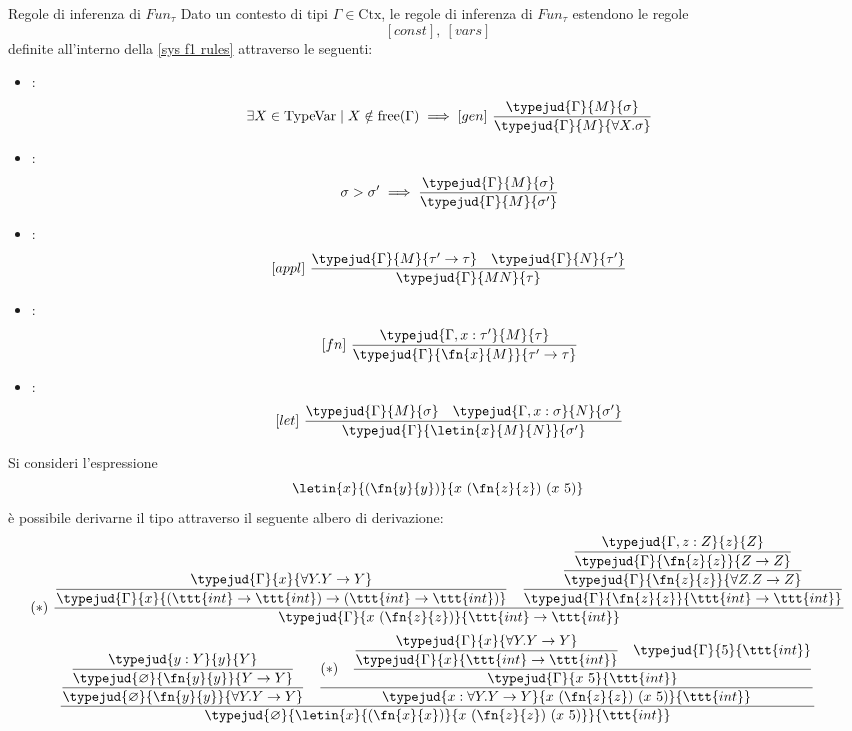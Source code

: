 \documentclass[a4paper, 12pt]{report}
\begin{document}
    \begin{framedprop}[breakable]{Regole di inferenza di $Fun_\tau$}
        Dato un contesto di tipi $\Gamma \in \mathrm{Ctx}$, le regole di inferenza di $Fun_\tau$ estendono le regole $$[const], \ [vars]$$ definite all'interno della \cref{sys f1 rules} attraverso le seguenti:

        \begin{itemize}
            \item {}: $$\exists X \in \mathrm{TypeVar} \mid X \notin \mathrm{free}(\Gamma) \implies [gen] \ \dfrac{\typejud{\Gamma}{M}{\sigma}}{\typejud{\Gamma}{M}{\forall X.\sigma}}$$
            \item {}: $$\sigma > \sigma ' \implies \dfrac{\typejud{\Gamma}{M}{\sigma}}{\typejud{\Gamma}{M}{\sigma'}}$$
            \item {}: $$[appl] \ \dfrac{\typejud{\Gamma}{M}{\tau' \to \tau} \quad \typejud{\Gamma}{N}{\tau'}}{\typejud{\Gamma}{MN}{\tau}}$$
            \item {}: $$[fn] \ \dfrac{\typejud{\Gamma,x:\tau'}{M}{\tau}}{\typejud{\Gamma}{\fn{x}{M}}{\tau' \to \tau}}$$
            \item {}: $$[let] \ \dfrac{\typejud{\Gamma}{M}{\sigma} \quad \typejud{\Gamma, x:\sigma}{N}{\sigma'}}{\typejud{\Gamma}{\letin{x}{M}{N}}{\sigma'}}$$
        \end{itemize}
    \end{framedprop}

    \begin{example}
        Si consideri l'espressione $$\letin{x}{(\fn{y}{y})}{x \ (\fn{z}{z}) \ (x \ 5)}$$ è possibile derivarne il tipo attraverso il seguente albero di derivazione: $$(*) \ \dfrac{\dfrac{\typejud{\Gamma}{x}{\forall Y . Y \to Y}}{\typejud{\Gamma}{x}{(\ttt{int} \to \ttt{int}) \to (\ttt{int} \to \ttt{int})}} \quad \dfrac{\dfrac{\dfrac{\typejud{\Gamma, z:Z}{z}{Z}}{\typejud{\Gamma}{\fn{z}{z}}{Z \to Z}}}{\typejud{\Gamma}{\fn{z}{z}}{\forall Z . Z \to Z}}}{\typejud{\Gamma}{\fn{z}{z}}{\ttt{int} \to \ttt{int}}}}{\typejud{\Gamma}{x \ (\fn{z}{z})}{\ttt{int} \to \ttt{int}}}$$ $$\dfrac{\dfrac{\dfrac{\typejud{y:Y}{y}{Y}}{\typejud{\varnothing}{\fn{y}{y}}{Y \to Y}}}{\typejud{\varnothing}{\fn{y}{y}}{\forall Y.Y \to Y}} \quad \dfrac{(*) \quad \dfrac{\dfrac{\typejud{\Gamma}{x}{\forall Y.Y \to Y}}{\typejud{\Gamma}{x}{\ttt{int} \to \ttt{int}}} \quad \typejud{\Gamma}{5}{\ttt{int}}}{\typejud{\Gamma}{x \ 5}{\ttt{int}}}}{\typejud{x: \forall Y .Y \to Y}{x \ (\fn{z}{z}) \ (x \ 5)}{\ttt{int}}}}{\typejud{\varnothing}{\letin{x}{(\fn{x}{x})}{x \ (\fn{z}{z}) \ (x \ 5)}}{\ttt{int}}}$$
    \end{example}
\end{document}
